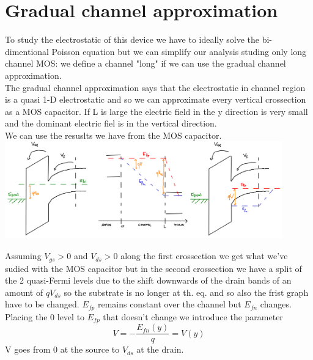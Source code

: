 \section{Gradual channel approximation}
To study the electrostatic of this device we have to ideally solve the bi-dimentional Poisson equation but we can simplify our analysis studing only long channel MOS: we define a channel "long" if we can use the gradual channel approximation.\\
The gradual channel approximation says that the electrostatic in channel region is a quasi 1-D electrostatic and so we can approximate every vertical crossection as a MOS capacitor. If L is large the electric field in the y direction is very small and the dominant electric fiel is in the vertical direction.\\
We can use the resuslts we have from the MOS capacitor.\\

\centering
\includegraphics[width=0.9\textwidth]{mos2.png}\\
\raggedright

Assuming $V_{gs}>0$ and $V_{ds}>0$ along the first crossection we get what we've sudied with the MOS capacitor but in the second crossection we have a split of the 2 quasi-Fermi levels due to the shift downwards of the drain bands of an amount of $qV_{ds}$ so the substrate is no longer at th. eq. and so also the frist graph have to be changed. $E_{fp}$ remains constant over the channel but $E_{fn}$ changes.\\
Placing the 0 level to $E_{fp}$ that doesn't change we introduce the parameter 
\begin{equation}
V=-\frac{E_{fn}(y)}{q}=V(y)
\end{equation}
V goes from 0 at the source to $V_{ds}$ at the drain.\\


